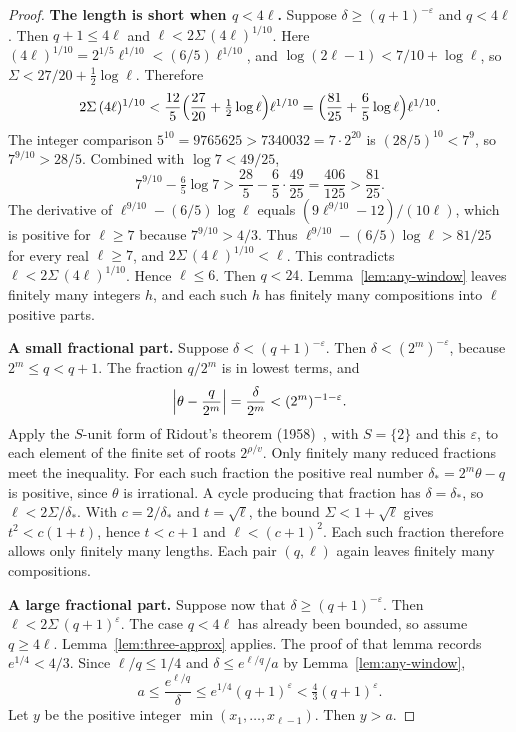\documentclass[11pt]{article}
\newcommand{\topic}[1]{\par\noindent\textbf{#1}}
\begin{document}
\begin{proof}
\topic{The length is short when $q < 4\ell$.}
Suppose $\delta \ge (q+1)^{-\varepsilon}$ and $q < 4\ell$.
Then $q+1 \le 4\ell$ and $\ell < 2\Sigma\,(4\ell)^{1/10}$.
Here $(4\ell)^{1/10} = 2^{1/5}\ell^{1/10} < (6/5)\ell^{1/10}$, and $\log(2\ell-1) < 7/10 + \log\ell$, so $\Sigma < 27/20 + \tfrac12\log\ell$.
Therefore
\[
2\Sigma\,(4\ell)^{1/10} < \frac{12}{5}\Bigl(\frac{27}{20} + \tfrac12\log\ell\Bigr)\ell^{1/10} = \Bigl(\frac{81}{25} + \frac65\log\ell\Bigr)\ell^{1/10}.
\]
The integer comparison $5^{10} = 9765625 > 7340032 = 7 \cdot 2^{20}$ is $(28/5)^{10} < 7^9$, so $7^{9/10} > 28/5$.
Combined with $\log 7 < 49/25$,
\[
7^{9/10} - \tfrac65\log 7 > \frac{28}{5} - \frac{6}{5}\cdot\frac{49}{25} = \frac{406}{125} > \frac{81}{25}.
\]
The derivative of $\ell^{9/10} - (6/5)\log\ell$ equals $(9\ell^{9/10} - 12)/(10\ell)$, which is positive for $\ell \ge 7$ because $7^{9/10} > 4/3$.
Thus $\ell^{9/10} - (6/5)\log\ell > 81/25$ for every real $\ell \ge 7$, and $2\Sigma\,(4\ell)^{1/10} < \ell$.
This contradicts $\ell < 2\Sigma\,(4\ell)^{1/10}$.
Hence $\ell \le 6$.
Then $q < 24$.
Lemma~\ref{lem:any-window} leaves finitely many integers $h$, and each such $h$ has finitely many compositions into $\ell$ positive parts.

\topic{A small fractional part.}
Suppose $\delta < (q+1)^{-\varepsilon}$.
Then $\delta < (2^m)^{-\varepsilon}$, because $2^m \le q < q+1$.
The fraction $q/2^m$ is in lowest terms, and
\[
\Bigl|\theta - \frac{q}{2^m}\Bigr| = \frac{\delta}{2^m} < (2^m)^{-1-\varepsilon}.
\]
Apply the $S$-unit form of Ridout's theorem (1958)~\cite{ridout}, with $S = \{2\}$ and this $\varepsilon$, to each element of the finite set of roots $2^{\rho/v}$.
Only finitely many reduced fractions meet the inequality.
For each such fraction the positive real number $\delta_* = 2^m\theta - q$ is positive, since $\theta$ is irrational.
A cycle producing that fraction has $\delta = \delta_*$, so $\ell < 2\Sigma/\delta_*$.
With $c = 2/\delta_*$ and $t = \sqrt{\ell}$, the bound $\Sigma < 1 + \sqrt{\ell}$ gives $t^2 < c(1+t)$, hence $t < c+1$ and $\ell < (c+1)^2$.
Each such fraction therefore allows only finitely many lengths.
Each pair $(q,\ell)$ again leaves finitely many compositions.

\topic{A large fractional part.}
Suppose now that $\delta \ge (q+1)^{-\varepsilon}$.
Then $\ell < 2\Sigma\,(q+1)^{\varepsilon}$.
The case $q < 4\ell$ has already been bounded, so assume $q \ge 4\ell$.
Lemma~\ref{lem:three-approx} applies.
The proof of that lemma records $e^{1/4} < 4/3$.
Since $\ell/q \le 1/4$ and $\delta \le e^{\ell/q}/a$ by Lemma~\ref{lem:any-window},
\[
a \le \frac{e^{\ell/q}}{\delta} \le e^{1/4}(q+1)^{\varepsilon} < \tfrac43(q+1)^{\varepsilon}.
\]
Let $y$ be the positive integer $\min(x_1,\ldots,x_{\ell-1})$.
Then $y > a$.


\end{proof}
\end{document}
